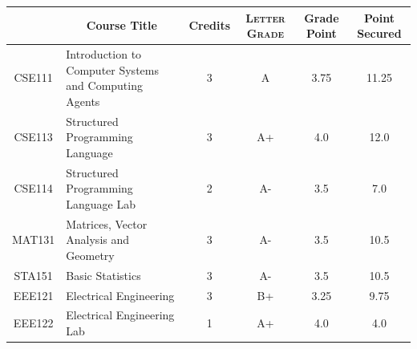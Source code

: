 \documentclass[11pt]{article}
\newcommand*{\numtwo}[1]{\pgfmathprintnumber[
                    fixed, precision=2, fixed zerofill=true]{#1}}
\begin{document}
                \begin{center}
                    \renewcommand{\arraystretch}{1.08}
                    
                \begin{tabular}{|c|l|c|>{\scshape}c|c|c|}
                \hline  \rule[-1ex]{0pt}{3.5ex} {\centering{\bf Course Code}} &  \multicolumn{1}{c|}{\textbf{Course Title}}  & {\bf Credits} & {\bf Letter Grade} & {\bf Grade Point} & {\bf Point Secured}  \\ 
                \hline   CSE111 &  Introduction to Computer Systems and Computing Agents		 & 3 & A & 3.75 & 11.25 \\ %
                \hline   CSE113 &  Structured Programming Language		 & 3 & A+ & 4.0 & 12.0 \\ %
                \hline   CSE114 &  Structured Programming Language Lab		 & 2 & A- & 3.5 & 7.0 \\ %
                \hline   MAT131 &  Matrices, Vector Analysis and Geometry		 & 3 & A- & 3.5 & 10.5 \\ %
                \hline   STA151 &  Basic Statistics		 & 3 & A- & 3.5 & 10.5 \\ %
                \hline   EEE121 &  Electrical Engineering		 & 3 & B+ & 3.25 & 9.75 \\ %
                \hline   EEE122 &  Electrical Engineering Lab		 & 1 & A+ & 4.0 & 4.0 \\ %

\hline                %
                \end{tabular}
                \end{center}
                \renewcommand{\arraystretch}{1.03}
\end{document}
